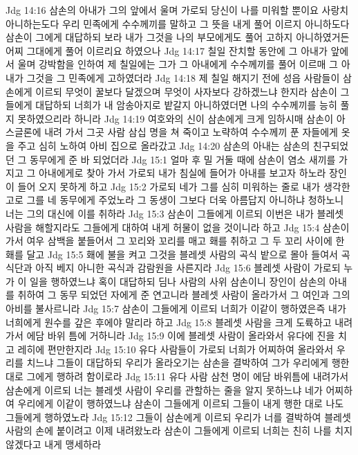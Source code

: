 Jdg 14:16  삼손의 아내가 그의 앞에서 울며 가로되 당신이 나를 미워할 뿐이요 사랑치 아니하는도다 우리 민족에게 수수께끼를 말하고 그 뜻을 내게 풀어 이르지 아니하도다 삼손이 그에게 대답하되 보라 내가 그것을 나의 부모에게도 풀어 고하지 아니하였거든 어찌 그대에게 풀어 이르리요 하였으나
Jdg 14:17  칠일 잔치할 동안에 그 아내가 앞에서 울며 강박함을 인하여 제 칠일에는 그가 그 아내에게 수수께끼를 풀어 이르매 그 아내가 그것을 그 민족에게 고하였더라
Jdg 14:18  제 칠일 해지기 전에 성읍 사람들이 삼손에게 이르되 무엇이 꿀보다 달겠으며 무엇이 사자보다 강하겠느냐 한지라 삼손이 그들에게 대답하되 너희가 내 암송아지로 밭갈지 아니하였더면 나의 수수께끼를 능히 풀지 못하였으리라 하니라
Jdg 14:19  여호와의 신이 삼손에게 크게 임하시매 삼손이 아스글론에 내려 가서 그곳 사람 삼십 명을 쳐 죽이고 노략하여 수수께끼 푼 자들에게 옷을 주고 심히 노하여 아비 집으로 올라갔고
Jdg 14:20  삼손의 아내는 삼손의 친구되었던 그 동무에게 준 바 되었더라
Jdg 15:1  얼마 후 밀 거둘 때에 삼손이 염소 새끼를 가지고 그 아내에게로 찾아 가서 가로되 내가 침실에 들어가 아내를 보고자 하노라 장인이 들어 오지 못하게 하고
Jdg 15:2  가로되 네가 그를 심히 미워하는 줄로 내가 생각한 고로 그를 네 동무에게 주었노라 그 동생이 그보다 더욱 아름답지 아니하냐 청하노니 너는 그의 대신에 이를 취하라
Jdg 15:3  삼손이 그들에게 이르되 이번은 내가 블레셋 사람을 해할지라도 그들에게 대하여 내게 허물이 없을 것이니라 하고
Jdg 15:4  삼손이 가서 여우 삼백을 붙들어서 그 꼬리와 꼬리를 매고 홰를 취하고 그 두 꼬리 사이에 한 홰를 달고
Jdg 15:5  홰에 불을 켜고 그것을 블레셋 사람의 곡식 밭으로 몰아 들여서 곡식단과 아직 베지 아니한 곡식과 감람원을 사른지라
Jdg 15:6  블레셋 사람이 가로되 누가 이 일을 행하였느냐 혹이 대답하되 딤나 사람의 사위 삼손이니 장인이 삼손의 아내를 취하여 그 동무 되었던 자에게 준 연고니라 블레셋 사람이 올라가서 그 여인과 그의 아비를 불사르니라
Jdg 15:7  삼손이 그들에게 이르되 너희가 이같이 행하였은즉 내가 너희에게 원수를 갚은 후에야 말리라 하고
Jdg 15:8  블레셋 사람을 크게 도륙하고 내려가서 에담 바위 틈에 거하니라
Jdg 15:9  이에 블레셋 사람이 올라와서 유다에 진을 치고 레히에 편만한지라
Jdg 15:10  유다 사람들이 가로되 너희가 어찌하여 올라와서 우리를 치느냐 그들이 대답하되 우리가 올라오기는 삼손을 결박하여 그가 우리에게 행한 대로 그에게 행하려 함이로라
Jdg 15:11  유다 사람 삼천 명이 에담 바위틈에 내려가서 삼손에게 이르되 너는 블레셋 사람이 우리를 관할하는 줄을 알지 못하느냐 네가 어찌하여 우리에게 이같이 행하였느냐 삼손이 그들에게 이르되 그들이 내게 행한 대로 나도 그들에게 행하였노라
Jdg 15:12  그들이 삼손에게 이르되 우리가 너를 결박하여 블레셋 사람의 손에 붙이려고 이제 내려왔노라 삼손이 그들에게 이르되 너희는 친히 나를 치지 않겠다고 내게 맹세하라
